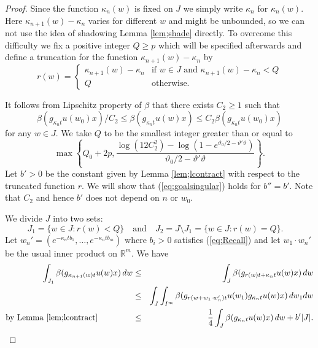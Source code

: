 \documentclass[12pt]{amsart}
\theoremstyle{definition}
\theoremstyle{remark}
\numberwithin{equation}{section}
\begin{document}
\begin{proof}
Since the function $\kappa_n(w)$ is fixed on $J$ we simply write $\kappa_n$ for $\kappa_n(w)$.
Here  $\kappa_{n+1}(w)-\kappa_n$ varies for different $w$ and might be unbounded, so we can not
 use the  idea of shadowing Lemma \ref{lem;shade} 
directly. To overcome this difficulty we fix a positive integer $Q\ge  p$ which will be specified 
afterwards  and 
 define a truncation  for the function $\kappa_{n+1}(w)-\kappa_n$ by 
\[
 r(w)=
\left\{
\begin{array}{cl}
\kappa_{n+1}(w)-\kappa_n & \mbox{if } w\in J \mbox{ and } \kappa_{n+1}(w)-\kappa_n<  Q \\
Q & \mbox{otherwise.}
\end{array}
\right.
\]

It follows from Lipschitz property  of $\beta$ that there exists
$C_2\ge 1$ such that  
\begin{equation}\label{eq;proof1}
\beta(g_{\kappa_nt}u(w_0)x)/C_2\le \beta(g_{\kappa_nt}u(w)x)\le C_2 \beta(g_{\kappa_nt}u(w_0)x) 
\end{equation}
 for any 
$w\in J$.
 We take $Q $ to be the smallest integer greater than or equal 
to 
\begin{equation}\label{eq;upperQ1}
\max\left\{Q_0+2p, \frac{\log (12C_2^2)-\log(1-e^{\vartheta_0/2-\vartheta'\vartheta}) }{\vartheta_0/2-\vartheta'\vartheta}\right\}.
\end{equation}
Let $b'>0$ be the constant given by Lemma \ref{lem;lcontract} with respect
 to the truncated   function $r$.  We will show that (\ref{eq;goalsingular}) holds
 for $b''=b'$.
 Note that $C_2$ and hence $b'$ does not depend on $n$ or $w_0$.
 
 
We divide $J$ into two sets: 
 \[
J_1=\{w\in J:  r(w)
<  Q\}\quad 
\mbox{and}\quad J_2=J\setminus J_1=\{w\in J:  r(w)= Q\}.
\quad
\]
Let $w_n'=(e^{-\kappa_ntb_1}, \ldots, e^{-\kappa_ntb_m})$ where $b_i>0$
satisfies (\ref{eq;Recall}) and let  $w_1\cdot w_n'$ 
be the usual inner product on $\mathbb R^m$. We have
\begin{eqnarray*}
 \int_{J_1}\beta (g_{\kappa_{n+1}(w)t}u(w)x)\,dw     &  \le & \int_{J}\beta (g_{r(w)t+\kappa_nt}u(w)x)\,dw   
\\
 \empty& \le &
\int_{J}\int_{I^m}\beta(g_{ r( w+w_1 \cdot w_n')t}u(w_1)g_{\kappa_nt}u(w)x)\,dw_1dw \\
\text{by Lemma \ref{lem;lcontract}\hspace{1.5cm}}&  \le &   \frac{1}{4}\int_{J}
\beta(g_{\kappa_nt}u(w)x)\,dw+b'|J|.
\end{eqnarray*}


\end{proof}
\end{document}

